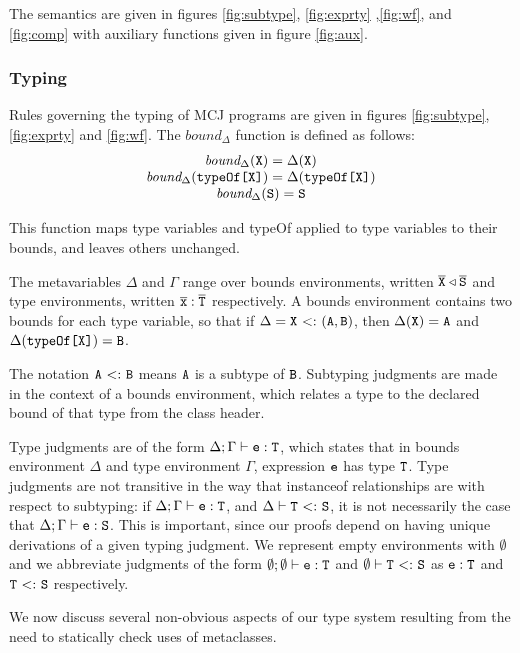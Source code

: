 \documentclass{acmconfbig}
\begin{document}
The
semantics are given in figures \ref{fig:subtype}, \ref{fig:exprty}
,\ref{fig:wf}, and \ref{fig:comp} with auxiliary functions given in
figure \ref{fig:aux}.


\subsubsection{Typing}
Rules governing the typing of MCJ programs are given in figures
\ref{fig:subtype}, \ref{fig:exprty} and \ref{fig:wf}.  The
$bound_{\Delta}$ function is defined as follows:
\begin{displaymath}
\begin{array}{c}
\mbox{\it bound}_{\Delta}(\mbox {\tt X}) = \Delta(\mbox {\tt X}) \\
\mbox{\it bound}_{\Delta}({{\mbox {\tt typeOf\mbox{\tt [}\ensuremath{\mbox {\tt X}}\mbox{\tt ]}}}}) = \Delta({{\mbox {\tt typeOf\mbox{\tt [}\ensuremath{\mbox {\tt X}}\mbox{\tt ]}}}}) \\
\mbox{\it bound}_{\Delta}(\mbox {\tt S}) = \mbox {\tt S}
\end{array}
\end{displaymath}

This function maps type variables and {\txt typeOf} applied to type
variables to their bounds, and leaves others unchanged.

The metavariables $\Delta$ and $\Gamma$ range over bounds
environments, written ${\overline{{\mbox {\tt X}}}} \triangleleft {\overline{{\mbox {\tt S}}}}$ and type environments,
written ${{\overline{{\mbox {\tt x}}}}} : {{\overline{{\mbox {\tt T}}}}}$ respectively.  A bounds environment contains
two bounds for each type variable, so that if $\Delta = \mbox {\tt X} {\ <:\ }
(\mbox {\tt A},\mbox {\tt B})$, then $\Delta(\mbox {\tt X}) = \mbox {\tt A}$ and $\Delta({{\mbox {\tt typeOf\mbox{\tt [}\ensuremath{\mbox {\tt X}}\mbox{\tt ]}}}}) = \mbox {\tt B}$.

The notation $\mbox {\tt A} {\ <:\ } \mbox {\tt B}$ means $\mbox {\tt A}$ is a subtype of $\mbox {\tt B}$.
Subtyping judgments are made in the context of a bounds environment,
which relates a type to the declared bound of that type from the class
header.

Type judgments are of the form ${\Delta;\Gamma} \vdash {\ensuremath{{\mbox {\tt e}} : {\mbox {\tt T}}}}$, which states
that in bounds environment $\Delta$ and type environment $\Gamma$,
expression $\mbox {\tt e}$ has type $\mbox {\tt T}$.  Type judgments are not transitive in
the way that {\txt instanceof} relationships are with respect to
subtyping: if ${\Delta;\Gamma} \vdash {\ensuremath{{\mbox {\tt e}} : {\mbox {\tt T}}}}$, and ${\Delta} \vdash {\ensuremath{{\mbox {\tt T}} {\ <:\ } {\mbox {\tt S}}}}$, it is not necessarily the case that ${\Delta;\Gamma} \vdash {\ensuremath{{\mbox {\tt e}} : {\mbox {\tt S}}}}$.
This is important, since our proofs depend on having unique
derivations of a given typing judgment. We represent empty
environments with $\emptyset$ and we abbreviate judgments of the form
${\emptyset;\emptyset} \vdash {\ensuremath {{\mbox {\tt e}} : {\mbox {\tt T}}}}$ and ${\emptyset} \vdash {\ensuremath {{\mbox {\tt T}} {\ <:\ } {\mbox {\tt S}}}}$ as ${{\mbox {\tt e}} : {\mbox {\tt T}}}$ and ${{\mbox {\tt T}} {\ <:\ } {\mbox {\tt S}}}$ respectively.

We now discuss several non-obvious aspects of our type system resulting from the need to statically check uses of metaclasses.
\end{document}
